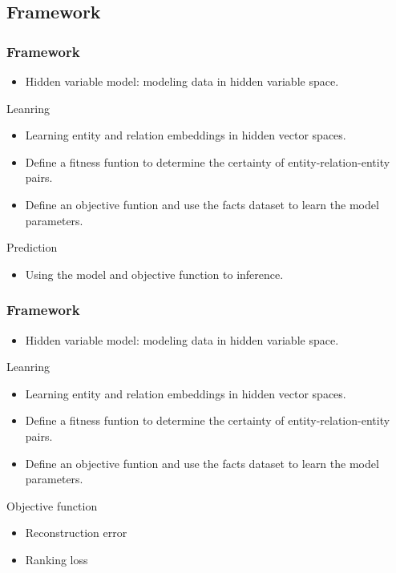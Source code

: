 \documentclass[pdf,10pt]{beamer}
\begin{document}
\subsection{Framework}
\begin{frame}
	\frametitle{Framework}
	\begin{itemize}
		\item Hidden variable model: modeling data in hidden variable space.
	\end{itemize}
	\begin{block}{Leanring}
		\begin{itemize}
			\item Learning entity and relation embeddings in hidden vector spaces.
			\item Define a fitness funtion to determine the certainty of entity-relation-entity pairs.
			\item Define an objective funtion and use the facts dataset to learn the model parameters.
		\end{itemize}
	\end{block}
	\begin{alertblock}{Prediction}
		\begin{itemize}
			\item Using the model and objective function to inference.
		\end{itemize}
	\end{alertblock}
\end{frame}

\begin{frame}
	\frametitle{Framework}
	\begin{itemize}
		\item Hidden variable model: modeling data in hidden variable space.
	\end{itemize}
	\begin{block}{Leanring}
		\begin{itemize}
			\item Learning entity and relation embeddings in hidden vector spaces.
			\item Define a fitness funtion to determine the certainty of entity-relation-entity pairs.
			\item Define an objective funtion and use the facts dataset to learn the model parameters.
		\end{itemize}
	\end{block}
	\begin{alertblock}{Objective function}
		\begin{itemize}
			\item Reconstruction error
			\item Ranking loss
		\end{itemize}
	\end{alertblock}
\end{frame}
\end{document}
